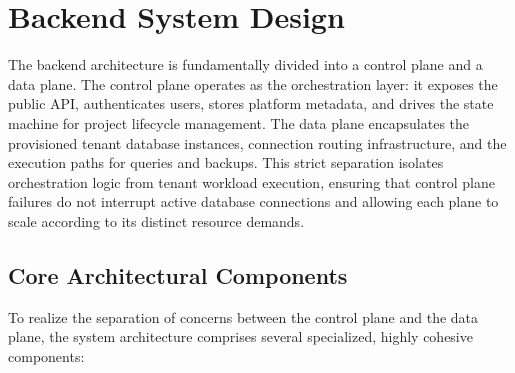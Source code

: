 \section{Backend System Design}

The backend architecture is fundamentally divided into a control plane and a data plane. The control plane operates as the orchestration layer: it exposes the public API, authenticates users, stores platform metadata, and drives the state machine for project lifecycle management. The data plane encapsulates the provisioned tenant database instances, connection routing infrastructure, and the execution paths for queries and backups. This strict separation isolates orchestration logic from tenant workload execution, ensuring that control plane failures do not interrupt active database connections and allowing each plane to scale according to its distinct resource demands.

\subsection{Core Architectural Components}

To realize the separation of concerns between the control plane and the data plane, the system architecture comprises several specialized, highly cohesive components:

